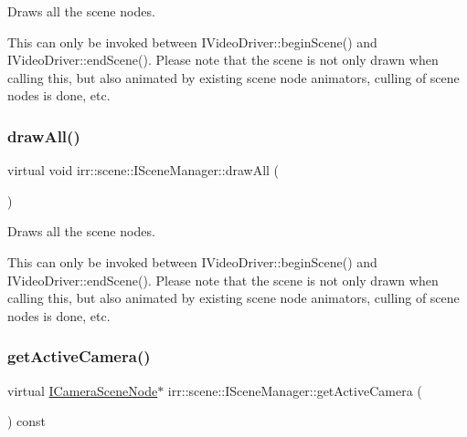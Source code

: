 Draws all the scene nodes. 

This can only be invoked between I\+Video\+Driver\+::begin\+Scene() and I\+Video\+Driver\+::end\+Scene(). Please note that the scene is not only drawn when calling this, but also animated by existing scene node animators, culling of scene nodes is done, etc. \mbox{\label{classirr_1_1scene_1_1ISceneManager_a04240262904667c821bd9de5e5fd9b02}} 
\subsubsection{\texorpdfstring{draw\+All()}{drawAll()}\hspace{0.1cm}{\footnotesize\ttfamily [2/2]}}
{\footnotesize\ttfamily virtual void irr\+::scene\+::\+I\+Scene\+Manager\+::draw\+All (\begin{DoxyParamCaption}{ }\end{DoxyParamCaption})\hspace{0.3cm}{\ttfamily [pure virtual]}}



Draws all the scene nodes. 

This can only be invoked between I\+Video\+Driver\+::begin\+Scene() and I\+Video\+Driver\+::end\+Scene(). Please note that the scene is not only drawn when calling this, but also animated by existing scene node animators, culling of scene nodes is done, etc. \mbox{\label{classirr_1_1scene_1_1ISceneManager_a71391ee37dece0714d95c519f110010f}} 
\subsubsection{\texorpdfstring{get\+Active\+Camera()}{getActiveCamera()}\hspace{0.1cm}{\footnotesize\ttfamily [1/2]}}
{\footnotesize\ttfamily virtual \hyperlink{classirr_1_1scene_1_1ICameraSceneNode}{I\+Camera\+Scene\+Node}$\ast$ irr\+::scene\+::\+I\+Scene\+Manager\+::get\+Active\+Camera (\begin{DoxyParamCaption}{ }\end{DoxyParamCaption}) const\hspace{0.3cm}{\ttfamily [pure virtual]}}



